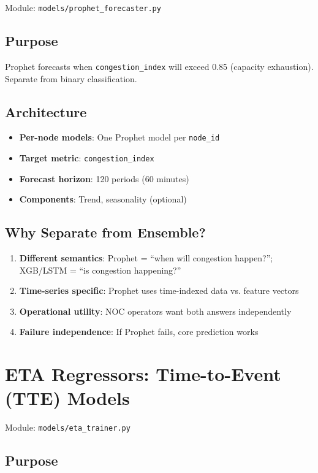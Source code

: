 \documentclass[11pt,a4paper,oneside]{report}
\begin{document}
Module: \texttt{models/prophet\_forecaster.py}

\subsection{Purpose}

Prophet forecasts when \texttt{congestion\_index} will exceed 0.85 (capacity exhaustion). Separate from binary classification.

\subsection{Architecture}

\begin{itemize}
    \item \textbf{Per-node models}: One Prophet model per \texttt{node\_id}
    \item \textbf{Target metric}: \texttt{congestion\_index}
    \item \textbf{Forecast horizon}: 120 periods (60 minutes)
    \item \textbf{Components}: Trend, seasonality (optional)
\end{itemize}

\subsection{Why Separate from Ensemble?}

\begin{enumerate}
    \item \textbf{Different semantics}: Prophet = ``when will congestion happen?''; XGB/LSTM = ``is congestion happening?''
    \item \textbf{Time-series specific}: Prophet uses time-indexed data vs. feature vectors
    \item \textbf{Operational utility}: NOC operators want both answers independently
    \item \textbf{Failure independence}: If Prophet fails, core prediction works
\end{enumerate}

\section{ETA Regressors: Time-to-Event (TTE) Models}

Module: \texttt{models/eta\_trainer.py}

\subsection{Purpose}
\end{document}
